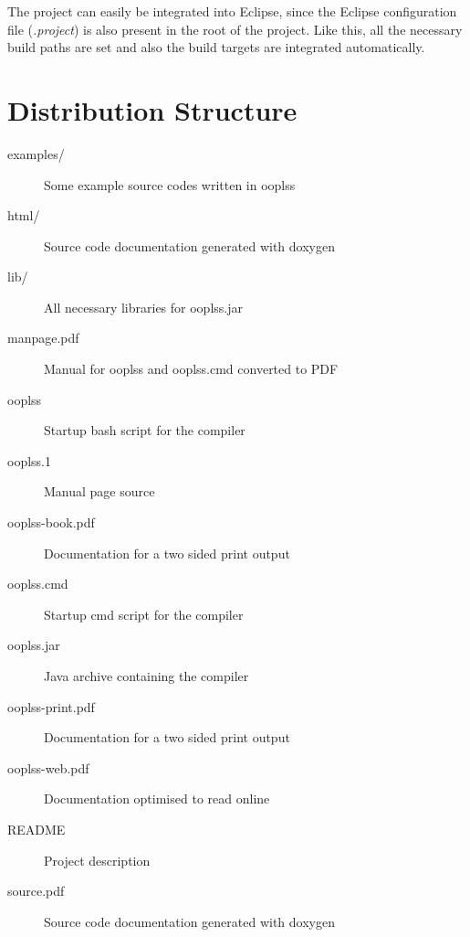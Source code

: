 The project can easily be integrated into Eclipse, since the Eclipse
configuration file (\emph{.project}) is also present in the root of the
project. Like this, all the necessary build paths are set and also the
build targets are integrated automatically.

\section{Distribution Structure}

\begin{description}
\item[examples/] Some example source codes written in ooplss
\item[html/] Source code documentation generated with doxygen
\item[lib/] All necessary libraries for ooplss.jar
\item[manpage.pdf] Manual for ooplss and ooplss.cmd converted to PDF
\item[ooplss] Startup bash script for the compiler
\item[ooplss.1] Manual page source
\item[ooplss-book.pdf] Documentation for a two sided print output
\item[ooplss.cmd] Startup cmd script for the compiler
\item[ooplss.jar] Java archive containing the compiler
\item[ooplss-print.pdf] Documentation for a two sided print output
\item[ooplss-web.pdf] Documentation optimised to read online
\item[README] Project description
\item[source.pdf] Source code documentation generated with doxygen
\end{description}

